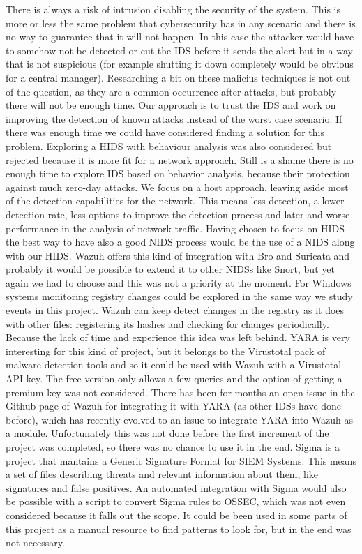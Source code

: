 \linej
\linej
There is always a risk of intrusion disabling the security of the system.
This is more or less the same problem that cybersecurity has in any scenario and there is no way to guarantee that it will not happen.
In this case the attacker would have to somehow not be detected or cut the IDS before it sends the alert but in a way that is not suspicious (for example shutting it down completely would be obvious for a central manager).
Researching a bit on these malicius techniques is not out of the question, as they are a common occurrence after attacks, but probably there will not be enough time.
\linej
Our approach is to trust the IDS and work on improving the detection of known attacks instead of the worst case scenario.
If there was enough time we could have considered finding a solution for this problem.
\linej
\linej
Exploring a HIDS with behaviour analysis was also considered but rejected because it is more fit for a network approach. Still is a shame there is no enough time to explore IDS based on behavior analysis, because their protection against much zero-day attacks.
\linej
\linej
We focus on a host approach, leaving aside most of the detection capabilities for the network. This means less detection, a lower detection rate, less options to improve the detection process and later and worse performance in the analysis of network traffic. Having chosen to focus on HIDS the best way to have also a good NIDS process would be the use of a NIDS along with our HIDS.
\linej
Wazuh offers this kind of integration with Bro and Suricata and probably it would be possible to extend it to other NIDSs like Snort, but yet again we had to choose and this was not a priority at the moment.
\linej
\linej
For Windows systems monitoring registry changes could be explored in the same way we study events in this project.
Wazuh can keep detect changes in the registry as it does with other files: registering its hashes and checking for changes periodically.
Because the lack of time and experience this idea was left behind.
\linej
\linej
YARA is very interesting for this kind of project, but it belongs to the Virustotal pack of malware detection tools and so it could be used with Wazuh with a Virustotal API key. The free version only allows a few queries and the option of getting a premium key was not considered. There has been for months an open issue in the Github page of Wazuh for integrating it with YARA (as other IDSs have done before), which has recently evolved to an issue to integrate YARA into Wazuh as a module\cite{yara_module}.
Unfortunately this was not done before the first increment of the project was completed, so there was no chance to use it in the end.
\linej
\linej
Sigma\cite{sigma} is a project that mantains a Generic Signature Format for SIEM Systems. This means a set of files describing threats and relevant information about them, like signatures and false positives. An automated integration with Sigma would also be possible with a script to convert Sigma rules to OSSEC, which was not even considered because it falls out the scope. It could be been used in some parts of this project as a manual resource to find patterns to look for, but in the end was not necessary.

